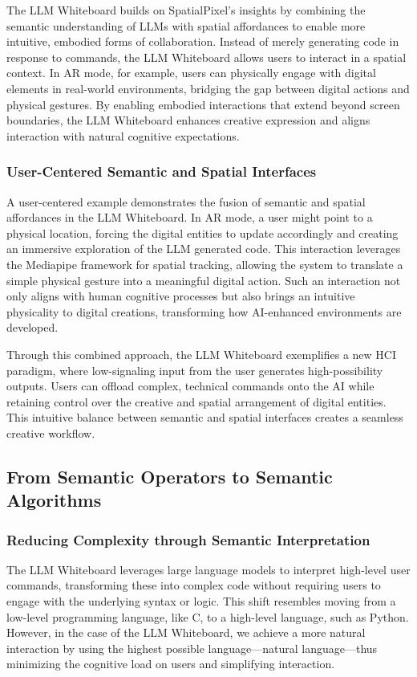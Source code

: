 The LLM Whiteboard builds on SpatialPixel’s insights by combining the semantic understanding of LLMs with spatial affordances to enable more intuitive, embodied forms of collaboration.
Instead of merely generating code in response to commands, the LLM Whiteboard allows users to interact in a spatial context.
In AR mode, for example, users can physically engage with digital elements in real-world environments, bridging the gap between digital actions and physical gestures.
By enabling embodied interactions that extend beyond screen boundaries, the LLM Whiteboard enhances creative expression and aligns interaction with natural cognitive expectations.

\subsubsection{User-Centered Semantic and Spatial Interfaces}

A user-centered example demonstrates the fusion of semantic and spatial affordances in the LLM Whiteboard.
In AR mode, a user might point to a physical location, forcing the digital entities to update accordingly and creating an immersive exploration of the LLM generated code.
This interaction leverages the Mediapipe framework for spatial tracking, allowing the system to translate a simple physical gesture into a meaningful digital action.
Such an interaction not only aligns with human cognitive processes but also brings an intuitive physicality to digital creations, transforming how AI-enhanced environments are developed.

Through this combined approach, the LLM Whiteboard exemplifies a new HCI paradigm, where low-signaling input from the user generates high-possibility outputs.
Users can offload complex, technical commands onto the AI while retaining control over the creative and spatial arrangement of digital entities.
This intuitive balance between semantic and spatial interfaces creates a seamless creative workflow.

\subsection{From Semantic Operators to Semantic Algorithms}
\subsubsection{Reducing Complexity through Semantic Interpretation}
The LLM Whiteboard leverages large language models to interpret high-level user commands, transforming these into complex code without requiring users to engage with the underlying syntax or logic.
This shift resembles moving from a low-level programming language, like C, to a high-level language, such as Python.
However, in the case of the LLM Whiteboard, we achieve a more natural interaction by using the highest possible language—natural language—thus minimizing the cognitive load on users and simplifying interaction.

